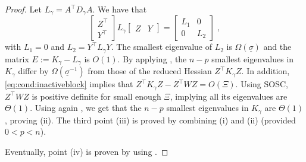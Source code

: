 \begin{proof}
  Let $L_\gamma = A^\top D_\gamma A$.
  We have that
  \begin{equation}
    \begin{bmatrix}
      Z^\top \\ Y^\top
    \end{bmatrix}
    L_\gamma \begin{bmatrix}Z & Y \end{bmatrix}
    = \begin{bmatrix}
      L_1 & 0 \\
      0 & L_2
    \end{bmatrix} \; ,
  \end{equation}
  with $L_1 = 0$ and $L_2 = Y^\top L_\gamma Y$.
  The smallest eigenvalue of $L_2$ is $\Omega(\underline{\sigma})$
  and the matrix $E := K_\gamma - L_\gamma$ is $O(1)$.
  By applying \cite[Theorem 3.1, (ii)]{wright1998ill},
  the $n - p$ smallest eigenvalues in $K_\gamma$ differ by
  $\Omega(\underline{\sigma}^{-1})$ from those of the reduced Hessian $Z^\top K_\gamma Z$.
  In addition, \eqref{eq:cond:inactiveblock} implies
  that $Z^\top K_\gamma Z - Z^\top W Z = O(\Xi)$. Using SOSC,
  $Z^\top W Z$ is positive definite for small enough $\Xi$, implying
  all its eigenvalues are $\Theta(1)$. Using again \cite[Lemma 3.1]{wright1998ill},
  we get that the $n-p$ smallest eigenvalues in $K_\gamma$ are $\Theta(1)$,
  proving (ii). The third point (iii) is proved by combining
  (i) and (ii) (provided $0 < p < n$).

  Eventually, point (iv) is proven by using \cite[Theorem 3.1, (i)]{wright1998ill}.
\end{proof}


